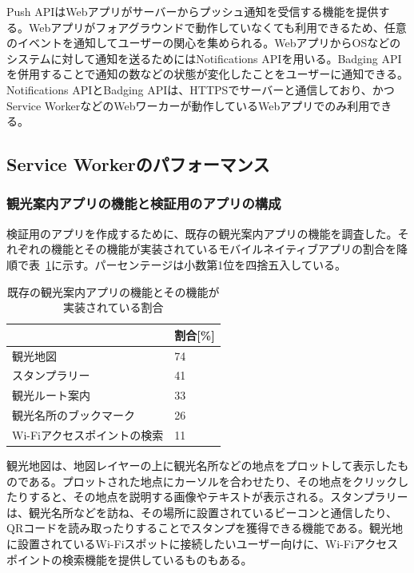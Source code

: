 Push APIはWebアプリがサーバーからプッシュ通知を受信する機能を提供する。Webアプリがフォアグラウンドで動作していなくても利用できるため、任意のイベントを通知してユーザーの関心を集められる。WebアプリからOSなどのシステムに対して通知を送るためにはNotifications APIを用いる。Badging APIを併用することで通知の数などの状態が変化したことをユーザーに通知できる。Notifications APIとBadging APIは、HTTPSでサーバーと通信しており、かつService WorkerなどのWebワーカーが動作しているWebアプリでのみ利用できる。

\subsection{Service Workerのパフォーマンス}\label{subsection:Service Workerのパフォーマンス}
\subsubsection{観光案内アプリの機能と検証用のアプリの構成}\label{subsubsection:観光案内アプリに求められる機能と検証用のアプリの構成}
検証用のアプリを作成するために、既存の観光案内アプリの機能を調査した。それぞれの機能とその機能が実装されているモバイルネイティブアプリの割合を降順で表~\ref{table:既存の観光案内アプリの機能とその機能が実装されている割合}に示す。パーセンテージは小数第1位を四捨五入している。
\begin{table}
  \caption{既存の観光案内アプリの機能とその機能が実装されている割合}\label{table:既存の観光案内アプリの機能とその機能が実装されている割合}
  \centering
  \begin{tabular}{|p{15em}|p{10em}|}
    \hline
    & 割合[\%] \\ \hline
    観光地図 & 74 \\ \hline
    スタンプラリー & 41\\ \hline
    観光ルート案内 & 33\\ \hline
    観光名所のブックマーク & 26\\ \hline
    Wi-Fiアクセスポイントの検索 & 11 \\ \hline
  \end{tabular}

\end{table}
観光地図は、地図レイヤーの上に観光名所などの地点をプロットして表示したものである。プロットされた地点にカーソルを合わせたり、その地点をクリックしたりすると、その地点を説明する画像やテキストが表示される。スタンプラリーは、観光名所などを訪ね、その場所に設置されているビーコンと通信したり、QRコードを読み取ったりすることでスタンプを獲得できる機能である。観光地に設置されているWi-Fiスポットに接続したいユーザー向けに、Wi-Fiアクセスポイントの検索機能を提供しているものもある。

